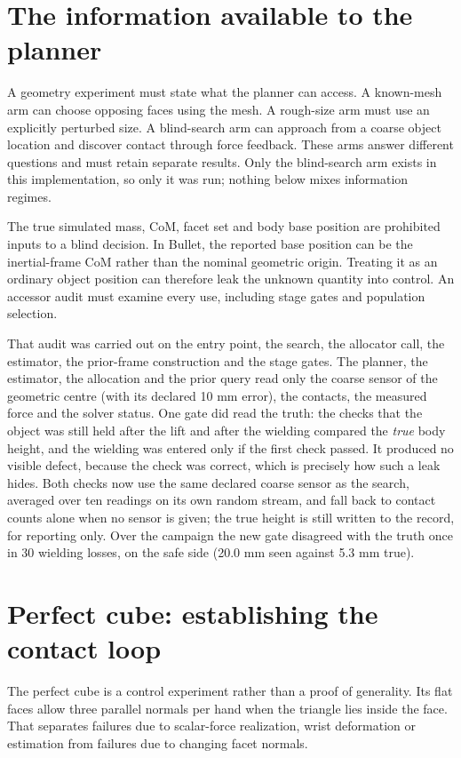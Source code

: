 \section{The information available to the planner}
\label{sec:geo-information}

A geometry experiment must state what the planner can access. A known-mesh arm can choose opposing faces using the mesh. A rough-size arm must use an explicitly perturbed size. A blind-search arm can approach from a coarse object location and discover contact through force feedback. These arms answer different questions and must retain separate results. Only the blind-search arm exists in this implementation, so only it was run; nothing below mixes information regimes.

The true simulated mass, CoM, facet set and body base position are prohibited inputs to a blind decision. In Bullet, the reported base position can be the inertial-frame CoM rather than the nominal geometric origin. Treating it as an ordinary object position can therefore leak the unknown quantity into control. An accessor audit must examine every use, including stage gates and population selection.

That audit was carried out on the entry point, the search, the allocator call, the estimator, the prior-frame construction and the stage gates. The planner, the estimator, the allocation and the prior query read only the coarse sensor of the geometric centre (with its declared 10 mm error), the contacts, the measured force and the solver status. One gate did read the truth: the checks that the object was still held after the lift and after the wielding compared the \emph{true} body height, and the wielding was entered only if the first check passed. It produced no visible defect, because the check was correct, which is precisely how such a leak hides. Both checks now use the same declared coarse sensor as the search, averaged over ten readings on its own random stream, and fall back to contact counts alone when no sensor is given; the true height is still written to the record, for reporting only. Over the campaign the new gate disagreed with the truth once in 30 wielding losses, on the safe side (20.0 mm seen against 5.3 mm true).

\section{Perfect cube: establishing the contact loop}

The perfect cube is a control experiment rather than a proof of generality. Its flat faces allow three parallel normals per hand when the triangle lies inside the face. That separates failures due to scalar-force realization, wrist deformation or estimation from failures due to changing facet normals.

